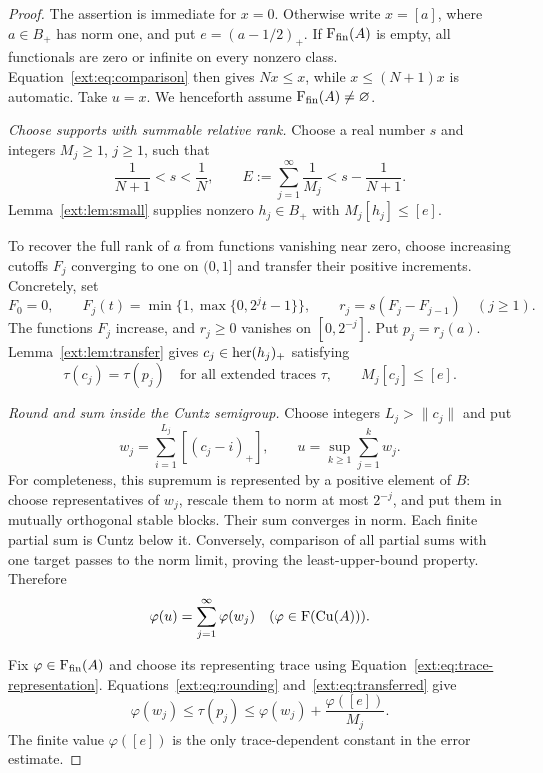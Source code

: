 \begin{proof}
The assertion is immediate for $x=0$. Otherwise write $x=[a]$,
where $a\in B_+$ has norm one, and put $e=(a-1/2)_+$.
If $\mathrm F_{\mathrm{fin}}(A)$ is empty, all functionals are zero or infinite on
every nonzero class. Equation~\eqref{ext:eq:comparison} then gives
$Nx\le x$, while $x\le(N+1)x$ is automatic. Take $u=x$.
We henceforth assume $\mathrm F_{\mathrm{fin}}(A)\ne\varnothing$.

\medskip\noindent
\textit{Choose supports with summable relative rank.}
Choose a real number $s$ and integers $M_j\ge1$, $j\ge1$, such that
\begin{equation}
\label{ext:eq:budget}
 \frac1{N+1}<s<\frac1N,\qquad
 E:=\sum_{j=1}^{\infty}\frac1{M_j}<s-\frac1{N+1}.
\end{equation}
Lemma~\ref{ext:lem:small} supplies nonzero $h_j\in B_+$ with
$M_j[h_j]\le[e]$.

To recover the full rank of $a$ from functions vanishing near zero,
choose increasing cutoffs $F_j$ converging to one on $(0,1]$ and
transfer their positive increments. Concretely, set
\[
 F_0=0,\qquad F_j(t)=\min\{1,\max\{0,2^jt-1\}\},\qquad
 r_j=s(F_j-F_{j-1})\quad(j\ge1).
\]
The functions $F_j$ increase, and $r_j\ge0$ vanishes on
$[0,2^{-j}]$. Put $p_j=r_j(a)$.
Lemma~\ref{ext:lem:transfer} gives $c_j\in\operatorname{her}(h_j)_+$ satisfying
\begin{equation}
\label{ext:eq:transferred}
 \tau(c_j)=\tau(p_j)\quad\text{for all extended traces }\tau,
 \qquad M_j[c_j]\le[e].
\end{equation}

\medskip\noindent
\textit{Round and sum inside the Cuntz semigroup.}
Choose integers $L_j>\|c_j\|$ and put
\begin{equation}
\label{ext:eq:u}
 w_j=\sum_{i=1}^{L_j}[(c_j-i)_+],\qquad
 u=\sup_{k\ge1}\sum_{j=1}^k w_j.
\end{equation}
For completeness, this supremum is represented by a positive
element of $B$: choose representatives of $w_j$, rescale them
to norm at most $2^{-j}$, and put them in mutually orthogonal
stable blocks. Their sum converges in norm. Each finite partial
sum is Cuntz below it. Conversely, comparison of all partial sums
with one target passes to the norm limit, proving the least-upper-bound
property. Therefore
\begin{equation}
\label{ext:eq:u-values}
 \varphi(u)=\sum_{j=1}^{\infty}\varphi(w_j)
 \quad(\varphi\in\mathrm F(\mathrm{Cu}(A))).
\end{equation}

Fix $\varphi\in\mathrm F_{\mathrm{fin}}(A)$ and choose its representing trace
using Equation~\eqref{ext:eq:trace-representation}.
Equations~\eqref{ext:eq:rounding} and~\eqref{ext:eq:transferred} give
\begin{equation}
\label{ext:eq:piece-error}
 \varphi(w_j)\le\tau(p_j)
 \le\varphi(w_j)+\frac{\varphi([e])}{M_j}.
\end{equation}
The finite value $\varphi([e])$ is the only trace-dependent
constant in the error estimate.


\end{proof}
